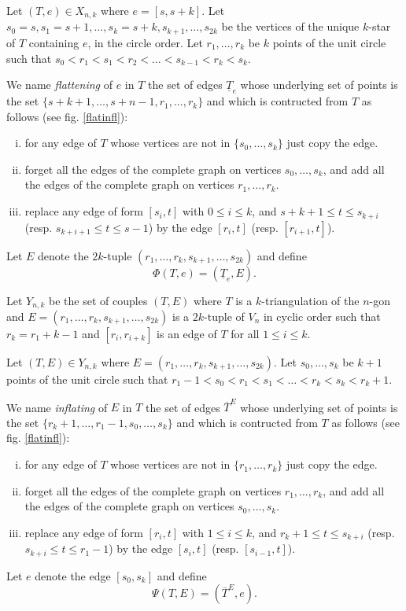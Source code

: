 \documentclass[12pt]{amsart}
\begin{document}
Let $(T,e)\in X_{n,k}$ where $e=[s,s+k]$.
Let $s_0=s,s_1=s+1,\ldots,s_k=s+k,s_{k+1},\ldots,s_{2k}$ be the vertices of the unique $k$-star of $T$ containing $e$, in the circle order. Let $r_1,\ldots,r_k$ be $k$ points of the unit circle such that $s_0<r_1<s_1<r_2<\ldots<s_{k-1}<r_k<s_k$.

We name \emph{flattening} of $e$ in $T$ the set of edges $\underline{T}_e$ whose underlying set of points is the set $\{s+k+1,\ldots,s+n-1,r_1,\ldots,r_k\}$ and which is contructed from $T$ as follows (see fig. \ref{flatinfl}):
\begin{enumerate}[(i)]
\item for any edge of $T$ whose vertices are not in $\{s_0,\ldots,s_k\}$ just copy the edge.
\item forget all the edges of the complete graph on vertices $s_0,\ldots,s_k$, and add all the edges of the complete graph on vertices $r_1,\ldots,r_k$.
\item replace any edge of form $[s_i,t]$ with $0\le i\le k$, and $s+k+1\le t \le s_{k+i}$ (resp. $s_{k+i+1}\le t\le s-1$) by the edge $[r_i,t]$ (resp. $[r_{i+1},t]$).
\end{enumerate}
Let $E$ denote the $2k$-tuple $(r_1,\ldots,r_k,s_{k+1},\ldots,s_{2k})$ and define $$\Phi(T,e)=(\underline{T}_e,E).$$

\bigskip
Let $Y_{n,k}$ be the set of couples $(T,E)$ where $T$ is a $k$-triangulation of the $n$-gon and $E=(r_1,\ldots,r_k,s_{k+1},\ldots,s_{2k})$ is a $2k$-tuple of $V_{n}$ in cyclic order such that $r_k=r_1+k-1$ and $[r_i,r_{i+k}]$ is an edge of $T$ for all $1\le i\le k$.

Let $(T,E)\in Y_{n,k}$ where $E=(r_1,\ldots,r_k,s_{k+1},\ldots,s_{2k})$. Let $s_0,\ldots,s_k$ be $k+1$ points of the unit circle such that $r_1-1<s_0<r_1<s_1<\ldots<r_k<s_k<r_k+1$.

We name \emph{inflating} of $E$ in $T$ the set of edges $\overline{T}^E$ whose underlying set of points is the set $\{r_k+1,\ldots,r_1-1,s_0,\ldots,s_k\}$ and which is contructed from $T$ as follows (see fig. \ref{flatinfl}):
\begin{enumerate}[(i)]
\item for any edge of $T$ whose vertices are not in $\{r_1,\ldots,r_k\}$ just copy the edge.
\item forget all the edges of the complete graph on vertices $r_1,\ldots,r_k$, and add all the edges of the complete graph on vertices $s_0,\ldots,s_k$.
\item replace any edge of form $[r_i,t]$ with $1\le i\le k$, and $r_k+1\le t \le s_{k+i}$ (resp. $s_{k+i}\le t\le r_1-1$) by the edge $[s_i,t]$ (resp. $[s_{i-1},t]$).
\end{enumerate}
Let $e$ denote the edge $[s_0,s_k]$ and define $$\Psi(T,E)=(\overline{T}^E,e).$$
\end{document}

